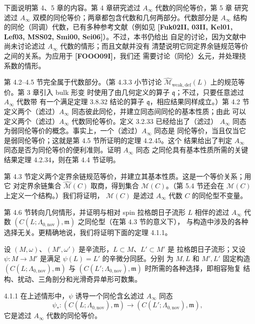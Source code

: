 下面说明第 4、5 章的内容。第 4 章研究滤过 $A_\infty$ 代数的同伦等价，第 5 章
研究滤过 $A_\infty$ 双模的同伦等价；两章都包含代数和几何两部分。代数部分是
$A_\infty$ 结构的同伦（同调）代数，已有多种参考文献（例如见
\textbf{[Fuk02II, 03II, Kel01, Lef03, MSS02, Smi00, Sei06]}）。不过，本书仍给出
自足的讨论，因为文献中尚未讨论滤过 $A_\infty$ 代数的情形；而且文献并没有
清楚说明它同定界余链规范等价之间的关系。为应用于 \textbf{[FOOO09I]}，我们还
需要讨论（同伦）幺元，并处理挠系数的情形。

第 4.2--4.5 节完全属于代数部分。（第 4.3.3 小节讨论
$\widehat{\mathcal M}_{\mathrm{weak,def}}(L)$ 上的规范等价。第 3 章引入 bulk 形变
时使用了由几何定义的算子 $\mathfrak q$；不过，只要任意滤过 $A_\infty$ 代数带
有一个满足定理 3.8.32 结论的算子 $\mathfrak q$，相应结果同样成立。）第 4.2 节
定义两个（滤过）$A_\infty$ 同态彼此同伦，并建立同态间同伦的基本性质；由此
可以定义两个（滤过）$A_\infty$ 代数同伦等价。定义 3.2.33 已经给出了（滤过）
$A_\infty$ 同态为弱同伦等价的概念。事实上，一个（滤过）$A_\infty$ 同态是
同伦等价，当且仅当它是弱同伦等价；这就是第 4.5 节所证明的定理 4.2.45。这个
结果给出了判定 $A_\infty$ 同态是否为同伦等价的便利准则。证明 $A_\infty$ 同态
之同伦具有基本性质所需的关键结果定理 4.2.34，则在第 4.4 节证明。

第 4.3 节定义两个定界余链规范等价，并建立其基本性质。这是一个等价关系；用它
对定界余链集合 $\widehat{\mathcal M}(C)$ 取商，得到集合
$\mathcal M(C)$。（第 5.4 节还会在 $\mathcal M(C)$ 上定义一个结构。）我们将证明，
$\mathcal M(C)$ 是滤过 $A_\infty$ 代数 $C$ 的同伦型不变量。

第 4.6 节转向几何情形，并证明与相对 spin 拉格朗日子流形 $L$ 相伴的滤过
$A_\infty$ 代数 $(C(L;\Lambda_{0,\mathrm{nov}}),\mathfrak m)$ 之同伦型（在第 4.3 节的意义下），
与构造中涉及的各种选择无关。更精确地说，我们将证明下面的定理 4.1.1。

设 $(M,\omega)$、$(M',\omega')$ 是辛流形，$L\subset M$、$L'\subset M'$ 是
拉格朗日子流形；又设 $\psi:M\to M'$ 是满足 $\psi(L)=L'$ 的辛微分同胚。分别
为 $M,L$ 和 $M',L'$ 固定构造
$(C(L;\Lambda_{0,\mathrm{nov}}),\mathfrak m)$ 与
$(C(L';\Lambda_{0,\mathrm{nov}}),\mathfrak m)$ 时所需的各种选择，即相容殆复
结构、扰动、三角剖分和光滑奇异单形可数集。

\begin{theorem}{4.1.1}\label{thm:4-1-1}
在上述情形中，$\psi$ 诱导一个同伦含幺滤过 $A_\infty$ 同态
\[
  \psi_*:
  (C(L;\Lambda_{0,\mathrm{nov}}),\mathfrak m)
  \longrightarrow
  (C(L';\Lambda_{0,\mathrm{nov}}),\mathfrak m),
\]
它是滤过 $A_\infty$ 代数的同伦等价。
\end{theorem}

